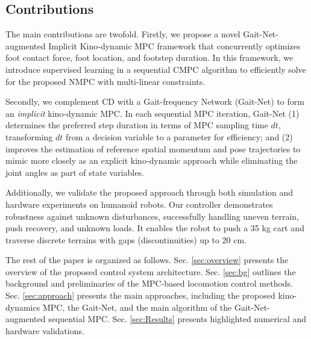 \subsection{Contributions}
The main contributions are twofold. Firstly, we propose a novel Gait-Net-augmented Implicit Kino-dynamic MPC framework that concurrently optimizes foot contact force, foot location, and footstep duration. In this framework, we introduce supervised learning in a sequential CMPC algorithm to efficiently solve for the proposed NMPC with multi-linear constraints. 

Secondly, we complement CD with a Gait-frequency Network (Gait-Net) to form an \textit{implicit} kino-dynamic MPC. In each sequential MPC iteration, Gait-Net (1) determines the preferred step duration in terms of MPC sampling time $dt$, transforming $dt$ from a decision variable to a parameter for efficiency; and (2) improves the estimation of reference spatial momentum and pose trajectories to mimic more closely as an explicit kino-dynamic approach while eliminating the joint angles as part of state variables.

Additionally, we validate the proposed approach through both simulation and hardware experiments on humanoid robots. Our controller demonstrates robustness against unknown disturbances, successfully handling uneven terrain, push recovery, and unknown loads. It enables the robot to push a 35 kg cart and traverse discrete terrains with gaps (discontinuities) up to 20 cm. 

The rest of the paper is organized as follows. Sec. \ref{sec:overview} presents the overview of the proposed control system architecture. Sec. \ref{sec:bg} outlines the background and preliminaries of the MPC-based locomotion control methods.  Sec. \ref{sec:approach} presents the main approaches, including the proposed kino-dynamics MPC, the Gait-Net, and the main algorithm of the Gait-Net-augmented sequential MPC. Sec. \ref{sec:Results} presents highlighted numerical and hardware validations.


